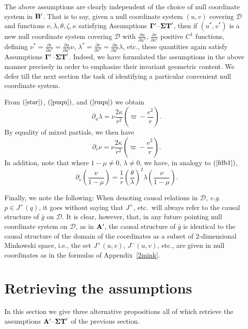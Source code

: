 \documentclass{article}
\begin{document}
The above assumptions are clearly independent of the choice of
null coordinate system in ${\bf B}'$. That is to say, given a null
coordinate system $(u,v)$ covering $\mathcal{D}$ 
and functions $\nu,\lambda,\theta,\zeta,\kappa$ satisfying Assumptions
${\bf \Gamma}'$--${\bf \Sigma T}'$, then if $(u^*,v^*)$ is a new null 
coordinate system
covering $\mathcal{D}$
with $\frac{\partial u}{\partial u^*}$,
$\frac{\partial v}{\partial v^*}$ positive $C^1$ functions,
defining $\nu^*=\frac{\partial r}{\partial u^*}=\frac{\partial u}{\partial u^*}\nu$, 
$\lambda^*=\frac{\partial r}{\partial v^*}=
\frac{\partial u}{\partial u^*}\lambda$, etc., these
quantities again satisfy Assumptions ${\bf \Gamma}'$--${\bf \Sigma T}'$.
Indeed, we have formulated the assumptions in the above manner precisely
in order to emphasize their invariant geometric content.
We defer till the next section the task of identifying a particular
convenient null coordinate system.


From $(\ref{star})$, $(\ref{puqu})$, and $(\ref{ruqu})$ we obtain
\begin{equation}
\label{lqu}
\partial_u\lambda=\nu\frac{2\kappa}{r^2}
\left(\varpi-\frac{e^2}{r}\right).
\end{equation}
By equality of mixed partials, we then have
\begin{equation}
\label{nqu}
\partial_v\nu=
\nu\frac{2\kappa}{r^2}
\left(\varpi-\frac{e^2}{r}\right).
\end{equation}
In addition, note that where $1-\mu\ne0$, $\lambda\ne0$, we
have,
in analogy to $(\ref{fdb1})$,
\begin{equation}
\label{fdb2}
\partial_v\left(\frac\nu{1-\mu}\right)
=\frac{1}r\left(\frac{\theta}{\lambda}\right)^2\lambda\left(\frac\nu{1-\mu}\right).
\end{equation}

Finally, we note the following:
When denoting causal relations in $\mathcal{D}$, 
\emph{e.g.}~$p\in J^+(q)$, it goes without saying
that $J^+$, etc.~will always
refer to the causal structure of $\bar{g}$ on $\mathcal{D}$. It is clear, however, that,
in any future pointing null coordinate system on $\mathcal{D}$, 
as in ${\bf A}'$, the causal structure of $\bar{g}$ is identical to the causal 
structure of the domain of the coordinates as a subset of
$2$-dimensional Minkowski space, i.e., the set $J^+(u,v)$, $J^-(u,v)$, etc., are 
given in null coordinates as in the formulas of Appendix~\ref{2mink}.


\section{Retrieving the assumptions}
\label{reduc}
In this section we give three alternative propositions
all of which retrieve the
assumptions ${\bf A}'$--${\bf \Sigma T}'$ 
of the previous section.
\end{document}

